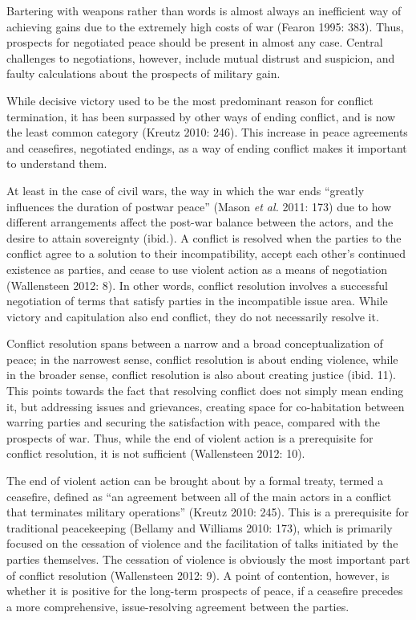 \documentclass[12pt,twoside]{reedthesis}
\begin{document}
Bartering with weapons rather than words is almost always an inefficient
way of achieving gains due to the extremely high costs of war (Fearon
1995: 383). Thus, prospects for negotiated peace should be present in
almost any case. Central challenges to negotiations, however, include
mutual distrust and suspicion, and faulty calculations about the
prospects of military gain.

While decisive victory used to be the most predominant reason for
conflict termination, it has been surpassed by other ways of ending
conflict, and is now the least common category (Kreutz 2010: 246). This
increase in peace agreements and ceasefires, negotiated endings, as a
way of ending conflict makes it important to understand them.

At least in the case of civil wars, the way in which the war ends
``greatly influences the duration of postwar peace'' (Mason \emph{et
al.} 2011: 173) due to how different arrangements affect the post-war
balance between the actors, and the desire to attain sovereignty
(ibid.). A conflict is resolved when the parties to the conflict agree
to a solution to their incompatibility, accept each other's continued
existence as parties, and cease to use violent action as a means of
negotiation (Wallensteen 2012: 8). In other words, conflict resolution
involves a successful negotiation of terms that satisfy parties in the
incompatible issue area. While victory and capitulation also end
conflict, they do not necessarily resolve it.

Conflict resolution spans between a narrow and a broad conceptualization
of peace; in the narrowest sense, conflict resolution is about ending
violence, while in the broader sense, conflict resolution is also about
creating justice (ibid. 11). This points towards the fact that resolving
conflict does not simply mean ending it, but addressing issues and
grievances, creating space for co-habitation between warring parties and
securing the satisfaction with peace, compared with the prospects of
war. Thus, while the end of violent action is a prerequisite for
conflict resolution, it is not sufficient (Wallensteen 2012: 10).

The end of violent action can be brought about by a formal treaty,
termed a ceasefire, defined as ``an agreement between all of the main
actors in a conflict that terminates military operations'' (Kreutz 2010:
245). This is a prerequisite for traditional peacekeeping (Bellamy and
Williams 2010: 173), which is primarily focused on the cessation of
violence and the facilitation of talks initiated by the parties
themselves. The cessation of violence is obviously the most important
part of conflict resolution (Wallensteen 2012: 9). A point of
contention, however, is whether it is positive for the long-term
prospects of peace, if a ceasefire precedes a more comprehensive,
issue-resolving agreement between the parties.
\end{document}
